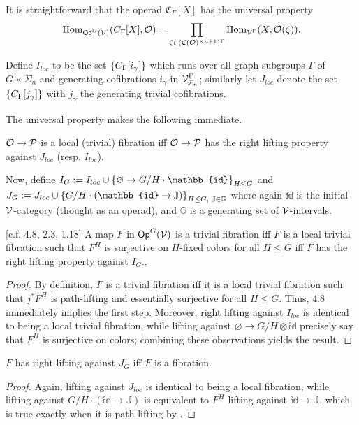 \documentclass[psamsfonts,oneside,10pt,letterpaper
,draft
]{amsart}%
\renewcommand{\F}{\mathcal F}
\newcommand{\J}{\ensuremath{\mathbb{J}}}
\renewcommand{\1}{\ensuremath{\mathbb{id}}}
\renewcommand{\P}{\ensuremath{\mathcal{P}}}
\begin{document}
It is straightforward that the operad $\mathfrak C_\Gamma[X]$ has the universal property
\begin{equation}
      \operatorname{Hom}_{\mathsf{Op}^G(\mathcal V)}(C_\Gamma[X], \mathcal{O}) = \mathop\prod\limits_{\zeta \in (\mathfrak C(\mathcal{O})^{\times n+1})^\Gamma}\operatorname{Hom}_{\mathcal V^\Gamma}(X, \mathcal{O}(\zeta)).
\end{equation}

Define $I_{loc}$ to be the set $\left\{C_{\Gamma}[i_\gamma]\right\}$ which runs over all
graph subgroups $\Gamma$ of $G \times \Sigma_n$ and
generating cofibrations $i_\gamma$ in $\V^\Gamma_{\F_n}$;
similarly let $J_{loc}$ denote the set $\left\{C_{\Gamma}[j_\gamma]\right\}$
with $j_\gamma$ the generating trivial cofibrations.

The universal property makes the following immediate.
\begin{corollary}
      $\O\to \P$ is a local (trivial) fibration {\sc iff} $\O\to \P$ has the right lifting property against $J_{loc}$ (resp. $I_{loc}$).
\end{corollary}

Now, define $I_{G}:= I_{loc} \mathbin{\cup} \set{\varnothing \to G/H \cdot \1}_{H\leq G}$
and
$J_{G} := J_{loc} \mathbin{\cup} \set{G/H \cdot (\1 \to \J)}_{H\leq G,\ \J\in\mathbb{G}}$
where again $\1$ is the initial $\mathcal V$-category (thought as an operad), and $\mathbb{G}$ is a generating set of $\mathcal V$-intervals. 

\begin{lemma}
      \label{CAV_4.8}
      [c.f. \cite{Cav14} 4.8, \cite{BM13} 2.3, \cite{CM13b} 1.18]
      A map $F$ in $\mathsf{Op}^G(\mathcal V)$ is a trivial fibration {\sc iff} $F$ is a local trivial fibration such that $F^H$ is surjective on $H$-fixed colors for all $H\leq G$ {\sc iff} $F$ has the right lifting property against $I_{G}$.. 
\end{lemma}
\begin{proof}
      By definition, $F$ is a trivial fibration {\sc iff}
      it is a local trivial fibration such that $j^*F^H$ is path-lifting and essentially surjective for all $H\leq G$.
      Thus, \cite{Cav14} 4.8 immediately implies the first step.
      Moreover, right lifting against $I_{loc}$ is identical to being a local trivial fibration, while
      lifting against $\varnothing \to G/H\otimes \1$ precisely say that $F^H$ is surjective on colors;
      combining these observations yields the result.
\end{proof}

\begin{lemma}
      $F$ has right lifting against $J_{G}$ {\sc iff} $F$ is a fibration.
\end{lemma}
\begin{proof}
      Again, lifting against $J_{loc}$ is identical to being a local fibration, while lifting against $G/H \cdot (\1 \to \J)$
      is equivalent to $F^H$ lifting against $\1 \to \J$, which is true exactly when it is path lifting by \cite{Cav14}. 
\end{proof}
\end{document}
